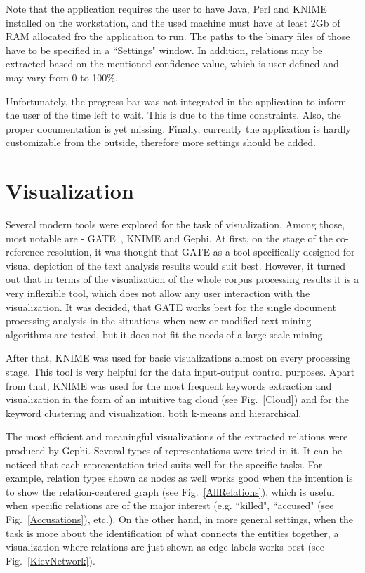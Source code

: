 \documentclass[]{article}
\begin{document}
Note that the application requires the user to have Java, Perl and KNIME installed on the workstation, and the used machine must have at least 2Gb of RAM allocated fro the application to run. The paths to the binary files of those have to be specified in a ``Settings" window. In addition, relations may be extracted based on the mentioned confidence value, which is user-defined and may vary from 0 to 100\%.

Unfortunately, the progress bar was not integrated in the application to inform the user of the time left to wait. This is due to the time constraints. Also, the proper documentation is yet missing. Finally, currently the application is hardly customizable from the outside, therefore more settings should be added.
%
\section{Visualization}
%
Several modern tools were explored for the task of visualization. Among those, most notable are - GATE~\cite{gate}, KNIME and Gephi. At first, on the stage of the co-reference resolution, it was thought that GATE as a tool specifically designed for visual depiction of the text analysis results would suit best. However, it turned out that in terms of the visualization of the whole corpus processing results it is a very inflexible tool, which does not allow any user interaction with the visualization. It was decided, that GATE works best for the single document processing analysis in the situations when new or modified text mining algorithms are tested, but it does not fit the needs of a large scale mining.

After that, KNIME was used for basic visualizations almost on every processing stage. This tool is very helpful for the data input-output control purposes. Apart from that, KNIME was used for the most frequent keywords extraction and visualization in the form of an intuitive tag cloud (see Fig.~\ref{Cloud}) and for the keyword clustering and visualization, both k-means and hierarchical.

The most efficient and meaningful visualizations of the extracted relations were produced by Gephi. Several types of representations were tried in it. It can be noticed that each representation tried suits well for the specific tasks. For example, relation types shown as nodes as well works good when the intention is to show the relation-centered graph (see Fig.~\ref{AllRelations}), which is useful when specific relations are of the major interest (e.g. ``killed", ``accused" (see Fig.~\ref{Accusations}), etc.). On the other hand, in more general settings, when the task is more about the identification of what connects the entities together, a visualization where relations are just shown as edge labels works best (see Fig.~\ref{KievNetwork}).
% 
\end{document}
